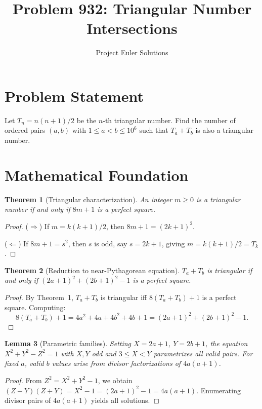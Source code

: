\documentclass[11pt]{article}
\title{Problem 932: Triangular Number Intersections}
\author{Project Euler Solutions}
\date{}
\newtheorem{theorem}{Theorem}
\newtheorem{lemma}[theorem]{Lemma}
\theoremstyle{definition}
\begin{document}
\maketitle

\section{Problem Statement}

Let $T_n = n(n+1)/2$ be the $n$-th triangular number. Find the number of ordered pairs $(a, b)$ with $1 \leq a < b \leq 10^6$ such that $T_a + T_b$ is also a triangular number.

\section{Mathematical Foundation}

\begin{theorem}[Triangular characterization]
An integer $m \geq 0$ is a triangular number if and only if $8m + 1$ is a perfect square.
\end{theorem}

\begin{proof}
($\Rightarrow$) If $m = k(k+1)/2$, then $8m + 1 = (2k+1)^2$.

($\Leftarrow$) If $8m + 1 = s^2$, then $s$ is odd, say $s = 2k+1$, giving $m = k(k+1)/2 = T_k$.
\end{proof}

\begin{theorem}[Reduction to near-Pythagorean equation]
$T_a + T_b$ is triangular if and only if $(2a+1)^2 + (2b+1)^2 - 1$ is a perfect square.
\end{theorem}

\begin{proof}
By Theorem~1, $T_a + T_b$ is triangular iff $8(T_a + T_b) + 1$ is a perfect square. Computing:
\[
8(T_a + T_b) + 1 = 4a^2 + 4a + 4b^2 + 4b + 1 = (2a+1)^2 + (2b+1)^2 - 1.
\]
\end{proof}

\begin{lemma}[Parametric families]
Setting $X = 2a+1$, $Y = 2b+1$, the equation $X^2 + Y^2 - Z^2 = 1$ with $X, Y$ odd and $3 \leq X < Y$ parametrizes all valid pairs. For fixed $a$, valid $b$ values arise from divisor factorizations of $4a(a+1)$.
\end{lemma}

\begin{proof}
From $Z^2 = X^2 + Y^2 - 1$, we obtain $(Z - Y)(Z + Y) = X^2 - 1 = (2a+1)^2 - 1 = 4a(a+1)$. Enumerating divisor pairs of $4a(a+1)$ yields all solutions.
\end{proof}
\end{document}

